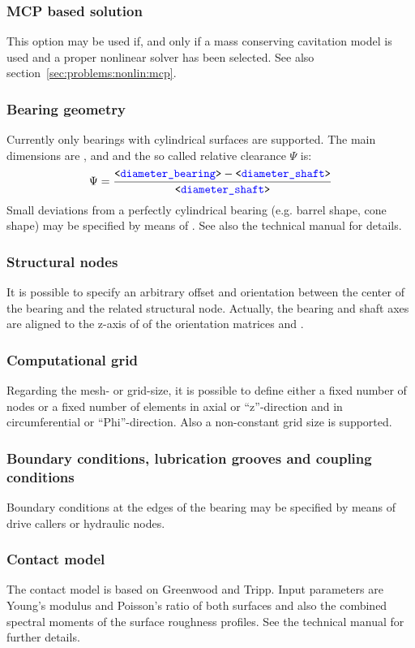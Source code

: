 \subsubsection{MCP based solution}
This option may be used if, and only if a mass conserving cavitation model is used and a proper nonlinear solver has been selected. See also section~\ref{sec:problems:nonlin:mcp}.
\subsubsection{Bearing geometry}
Currently only bearings with cylindrical surfaces are supported. The main dimensions are ,  and  and the so called relative clearance $\Psi$ is:
\begin{equation}
\Psi=\frac{\texttt{<\textcolor{blue}{diameter\_bearing}>} - \texttt{<\textcolor{blue}{diameter\_shaft}>}}{\texttt{<\textcolor{blue}{diameter\_shaft}>}}
\end{equation}
Small deviations from a perfectly cylindrical bearing (e.g. barrel shape, cone shape) may be specified by means of . See also the technical manual for details.
\subsubsection{Structural nodes}
It is possible to specify an arbitrary offset and orientation between the center of the bearing and the related structural node. Actually, the bearing and shaft axes are aligned to the z-axis of of the orientation matrices  and .
\subsubsection{Computational grid}
Regarding the mesh- or grid-size, it is possible to define either a fixed number of nodes or a fixed number of elements in axial or ``z''-direction and in circumferential or ``Phi''-direction. Also a non-constant grid size is supported.
\subsubsection{Boundary conditions, lubrication grooves and coupling conditions}
Boundary conditions at the edges of the bearing may be specified by means of drive callers or hydraulic nodes.
\subsubsection{Contact model}
The contact model is based on Greenwood and Tripp\cite{Greenwood-1970}. Input parameters are Young's modulus and Poisson's ratio of both surfaces and also the combined spectral moments of the surface roughness profiles. See the technical manual for further details.
